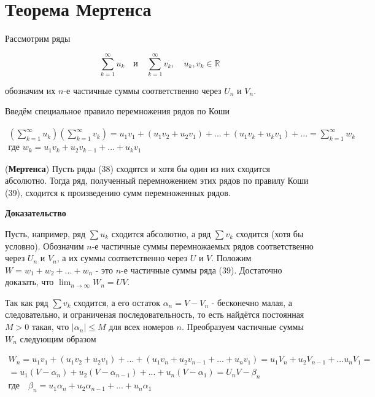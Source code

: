 \section{Теорема Мертенса}

Рассмотрим ряды

\begin{equation}
	\displaystyle\sum_{k = 1}^\infty u_k \quad \mbox{и} \quad \displaystyle\sum_{k = 1}^\infty v_k,\quad u_k, v_k \in \mathbb{R}
\end{equation}

обозначим их $n$-е частичные суммы соответственно через $U_n$ и $V_n$.

Введём специальное правило перемножения рядов по Коши

\begin{equation}
	\begin{gathered}
		\left( \displaystyle\sum_{k = 1}^\infty u_k \right) \left( \displaystyle\sum_{k = 1}^\infty v_k \right) = u_1v_1 + (u_1v_2 + u_2v_1) + ... + (u_1v_k + u_kv_1) + ... = \displaystyle\sum_{k = 1}^\infty w_k \\
		\mbox{где } w_k = u_1v_k + u_2v_{k - 1} + ... + u_kv_1
	\end{gathered}
\end{equation}

\begin{theorem}
	(\textbf{Мертенса}) Пусть ряды (38) сходятся  и хотя бы один из них сходится абсолютно. Тогда ряд, полученный перемножением этих рядов по правилу Коши (39), сходится к произведению сумм перемноженных рядов.
\end{theorem}
\textbf{Доказательство}

Пусть, например, ряд $\sum u_k$ сходится абсолютно, а ряд $\sum v_k$ сходится (хотя бы условно). Обозначим $n$-е частичные суммы перемножаемых рядов соответственно через $U_n$ и $V_n$, а их суммы соответственно через $U$ и $V$. Положим $W = w_1 + w_2 + ... + w_n$ - это $n$-е частичные суммы ряда (39). Достаточно доказать, что $\displaystyle\lim_{n \rightarrow \infty} W_n = UV$.

Так как ряд $\sum v_k$ сходится, а его остаток $\alpha_n = V - V_n$ - бесконечно малая, а следовательно, и ограниченая последовательность, то есть найдётся постоянная $M > 0$ такая, что $|\alpha_n| \leqslant M$ для всех номеров $n$. Преобразуем частичные суммы $W_n$ следующим образом

\begin{equation*}
	\begin{gathered}
		W_n = u_1v_1 + (u_1v_2 + u_2v_1) + ... + (u_1v_n + u_2v_{n - 1} + ... + u_nv_1) = u_1V_n + u_2V_{n - 1} + ... u_nV_1 = \\
		= u_1(V - \alpha_n) + u_2(V - \alpha_{n - 1}) + ... + u_n(V - \alpha_1) = U_nV - \beta_n \\
		\mbox{где}\quad \beta_n = u_1\alpha_n + u_2\alpha_{n - 1} + ... + u_n\alpha_1
	\end{gathered}
\end{equation*}

